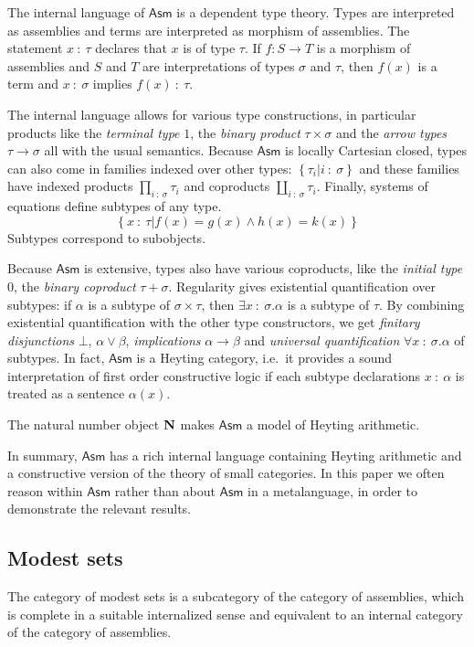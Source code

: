 \documentclass{amsart}
\theoremstyle{plain}
\theoremstyle{definition}
\newcommand\set[1]{\left\{#1\right\}}
\newcommand\Asm{\mathsf{Asm}}
\begin{document}
\newcommand\of{\mathord{\ :\ }}
The internal language of $\Asm$ is a dependent type theory. Types are interpreted as assemblies and terms are interpreted as morphism of assemblies. The statement $x\of\tau$ declares that $x$ is of type $\tau$. If $f:S\to T$ is a morphism of assemblies and $S$ and $T$ are interpretations of types $\sigma$ and $\tau$, then $f(x)$ is a term and $x\of \sigma$ implies $f(x)\of \tau$.  

The internal language allows for various type constructions, in particular products like the \emph{terminal type} $1$, the \emph{binary product} $\tau\times\sigma$ and the \emph{arrow types} $\tau\to\sigma$ all with the usual semantics. Because $\Asm$ is locally Cartesian closed, types can also come in families indexed over other types: $\set{\tau_i|i\of \sigma}$ and these families have indexed products $\prod_{i\of \sigma} \tau_i$ and coproducts $\coprod_{i\of \sigma} \tau_i$. Finally, systems of equations define subtypes of any type. \[\set{x\of\tau| f(x)=g(x)\land h(x)=k(x)} \] Subtypes correspond to subobjects.

Because $\Asm$ is extensive, types also have various coproducts, like the \emph{initial type} 0, the \emph{binary coproduct} $\tau+\sigma$. Regularity gives existential quantification over subtypes: if $\alpha$ is a subtype of $\sigma\times\tau$, then $\exists x\of\sigma.\alpha$ is a subtype of $\tau$. By combining existential quantification with the other type constructors, we get \emph{finitary disjunctions} $\bot$, $\alpha\vee \beta$, \emph{implications} $\alpha\to \beta$ and \emph{universal quantification} $\forall x\of\sigma.\alpha$ of subtypes. In fact, $\Asm$ is a Heyting category, i.e.\ it provides a sound interpretation of first order constructive logic if each subtype declarations $x\of \alpha$ is treated as a sentence $\alpha(x)$.

The natural number object $\mathbf N$ makes $\Asm$ a model of Heyting arithmetic. 

In summary, $\Asm$ has a rich internal language containing Heyting arithmetic and a constructive version of the theory of small categories. In this paper we often reason within $\Asm$ rather than about $\Asm$ in a metalanguage, in order to demonstrate the relevant results.

\subsection{Modest sets}
The category of modest sets is a subcategory of the category of assemblies, which is complete in a suitable internalized sense and equivalent to an internal category of the category of assemblies.
\end{document}
